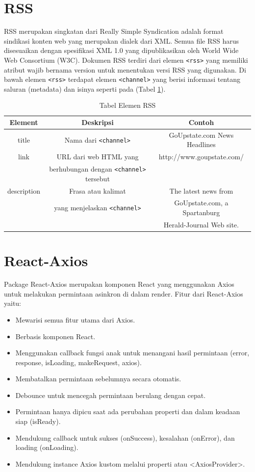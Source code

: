 \section{\texorpdfstring{RSS~\cite{rss-docs}}{RSS}}
RSS merupakan singkatan dari Really Simple Syndication adalah format sindikasi konten web yang merupakan dialek dari XML. Semua file RSS harus disesuaikan dengan spesifikasi XML 1.0 yang dipublikasikan oleh World Wide Web Consortium (W3C). Dokumen RSS terdiri dari elemen \texttt{<rss>} yang memiliki atribut wajib bernama version untuk menentukan versi RSS yang digunakan. Di bawah elemen \texttt{<rss>} terdapat elemen \texttt{<channel>} yang berisi informasi tentang saluran (metadata) dan isinya seperti pada (Tabel \ref{tab:elemen-rss}).
\begin{table} [H]
    \centering
    \caption{Tabel Elemen RSS}
    \begin{tabular}{|c|c|c|}
    \hline
       Element & Deskripsi & Contoh  \\ \hline
        title &  Nama dari \texttt{<channel>} & GoUpstate.com News Headlines \\ \hline
        link & URL dari web HTML yang & http://www.goupstate.com/ \\
        & berhubungan dengan \texttt{<channel>} tersebut & \\ \hline
        description & Frasa atau kalimat & The latest news from  \\ 
        & yang menjelaskan \texttt{<channel>} & GoUpstate.com, a Spartanburg \\ 
        & &  Herald-Journal Web site.\\ \hline
    \end{tabular}
    \label{tab:elemen-rss}
\end{table}

\section{\texorpdfstring{React-Axios~\cite{axios-docs}}{React-Axios}}
Package React-Axios merupakan komponen React yang menggunakan Axios untuk melakukan permintaan asinkron di dalam render. Fitur dari React-Axios yaitu:

\begin{itemize}
    \item Mewarisi semua fitur utama dari Axios.
    \item Berbasis komponen React.
    \item Menggunakan callback fungsi anak untuk menangani hasil permintaan (error, response, isLoading, makeRequest, axios).
    \item Membatalkan permintaan sebelumnya secara otomatis.
    \item Debounce untuk mencegah permintaan berulang dengan cepat.
    \item Permintaan hanya dipicu saat ada perubahan properti dan dalam keadaan siap (isReady).
    \item Mendukung callback untuk sukses (onSuccess), kesalahan (onError), dan loading (onLoading).
    \item Mendukung instance Axios kustom melalui properti atau <AxiosProvider>.
\end{itemize}

